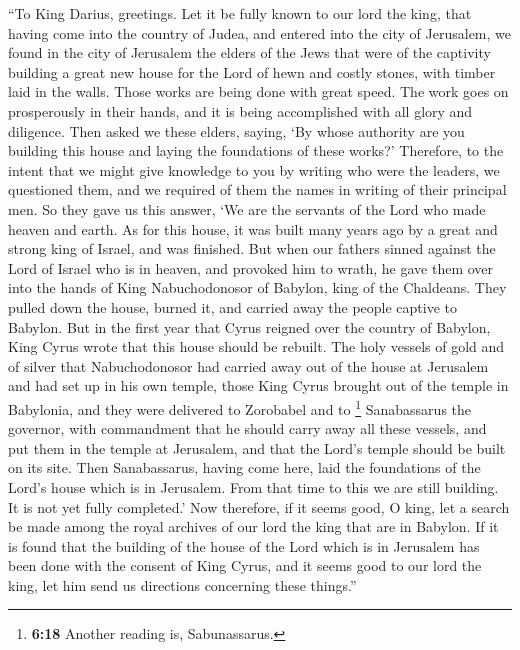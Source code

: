  ``To King Darius, greetings. Let it be fully known to our
lord the king, that having come into the country of Judea, and entered
into the city of Jerusalem, we found in the city of Jerusalem the elders
of the Jews that were of the captivity  building a great
new house for the Lord of hewn and costly stones, with timber laid in
the walls.  Those works are being done with great speed.
The work goes on prosperously in their hands, and it is being
accomplished with all glory and diligence.  Then asked we
these elders, saying, `By whose authority are you building this house
and laying the foundations of these works?'  Therefore,
to the intent that we might give knowledge to you by writing who were
the leaders, we questioned them, and we required of them the names in
writing of their principal men.  So they gave us this
answer, `We are the servants of the Lord who made heaven and earth.
 As for this house, it was built many years ago by a
great and strong king of Israel, and was finished.  But
when our fathers sinned against the Lord of Israel who is in heaven, and
provoked him to wrath, he gave them over into the hands of King
Nabuchodonosor of Babylon, king of the Chaldeans.  They
pulled down the house, burned it, and carried away the people captive to
Babylon.  But in the first year that Cyrus reigned over
the country of Babylon, King Cyrus wrote that this house should be
rebuilt.  The holy vessels of gold and of silver that
Nabuchodonosor had carried away out of the house at Jerusalem and had
set up in his own temple, those King Cyrus brought out of the temple in
Babylonia, and they were delivered to Zorobabel and to \footnote{\textbf{6:18}
  Another reading is, Sabunassarus.} Sanabassarus the governor,
 with commandment that he should carry away all these
vessels, and put them in the temple at Jerusalem, and that the Lord's
temple should be built on its site.  Then Sanabassarus,
having come here, laid the foundations of the Lord's house which is in
Jerusalem. From that time to this we are still building. It is not yet
fully completed.'  Now therefore, if it seems good, O
king, let a search be made among the royal archives of our lord the king
that are in Babylon.  If it is found that the building of
the house of the Lord which is in Jerusalem has been done with the
consent of King Cyrus, and it seems good to our lord the king, let him
send us directions concerning these things.''

